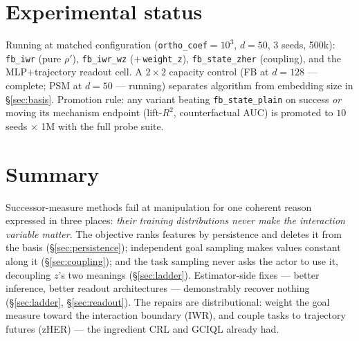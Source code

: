 \documentclass[11pt,a4paper]{article}
\begin{document}
\section{Experimental status}\label{sec:status}
Running at matched configuration (\texttt{ortho\_coef}$=10^{3}$, $d=50$, 3 seeds, 500k):
\texttt{fb\_iwr} (pure $\rho'$), \texttt{fb\_iwr\_wz} ($+$\,\texttt{weight\_z}),
\texttt{fb\_state\_zher} (coupling), and the MLP$+$trajectory readout cell. A $2\times2$ capacity
control (FB at $d{=}128$ --- complete; PSM at $d{=}50$ --- running) separates algorithm from
embedding size in \S\ref{sec:basis}. Promotion rule: any variant beating \texttt{fb\_state\_plain}
on success \emph{or} moving its mechanism endpoint (lift-$R^{2}$, counterfactual AUC) is promoted
to $10$ seeds $\times$ 1M with the full probe suite.

\section*{Summary}
Successor-measure methods fail at manipulation for one coherent reason expressed in three places:
\emph{their training distributions never make the interaction variable matter}. The objective
ranks features by persistence and deletes it from the basis (\S\ref{sec:persistence}); independent
goal sampling makes values constant along it (\S\ref{sec:coupling}); and the task sampling never
asks the actor to use it, decoupling $z$'s two meanings (\S\ref{sec:ladder}). Estimator-side fixes
--- better inference, better readout architectures --- demonstrably recover nothing
(\S\ref{sec:ladder}, \S\ref{sec:readout}). The repairs are distributional: weight the goal measure
toward the interaction boundary (IWR), and couple tasks to trajectory futures (zHER) --- the
ingredient CRL and GCIQL already had.
\end{document}
